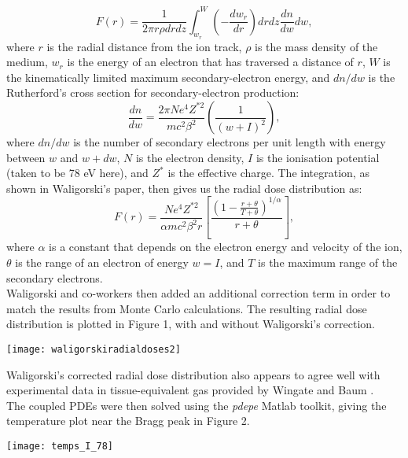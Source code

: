 \documentclass{article}
\begin{document}
\begin{multicols}{2}
\begin{equation}F(r)=\frac{1}{2\pi r\rho dr dz}\int_{w_{r}}^{W} (-\frac{dw_{r}}{dr}) dr dz \frac{dn}{dw} dw,
\end{equation}
where $r$ is the radial distance from the ion track, $\rho$ is the mass density of the medium, $w_{r}$ is the energy of an electron that has traversed a distance of $r$, $W$ is the kinematically limited maximum secondary-electron energy, and $dn/dw$ is the Rutherford's cross section for secondary-electron production:
\begin{equation} \frac{dn}{dw}=\frac{2\pi Ne^{4}Z^{*2}}{mc^{2}\beta^{2}}\left(\frac{1}{(w+I)^{2}}\right),
\end{equation}
where $dn/dw$ is the number of secondary electrons per unit length with energy between $w$ and $w+dw$, $N$ is the electron density, $I$ is the ionisation potential (taken to be 78 eV here), and $Z^{*}$ is the effective charge. The integration, as shown in Waligorski's paper, then gives us the radial dose distribution as:
\begin{equation} F(r)=\frac{Ne^{4}Z^{*2}}{\alpha mc^{2}\beta^{2}r}\left[\frac{(1-\frac{r+\theta}{T+\theta})^{1/\alpha}}{r+\theta}\right],
\end{equation}
where $\alpha$ is a constant that depends on the electron energy and velocity of the ion, $\theta$ is the range of an electron of energy $w=I$, and $T$ is the maximum range of the secondary electrons. \\
\indent Waligorski and co-workers then added an additional correction term \cite{waligorski} in order to match the results from Monte Carlo calculations. The resulting radial dose distribution is plotted in Figure 1, with and without Waligorski's correction. 
%
\begin{center}
\texttt{[image: waligorskiradialdoses2]}
\captionsetup[figure]{format=hang,font=small}
\label{fig1}
\end{center}
\indent Waligorski's corrected radial dose distribution also appears to agree well with experimental data in tissue-equivalent gas provided by Wingate and Baum \cite{wingate}.  \\
\indent The coupled PDEs were then solved using the \textit{pdepe} Matlab toolkit, giving the temperature plot near the Bragg peak in Figure 2. 
%
\begin{center}
\texttt{[image: temps\_I\_78]}
\captionsetup[figure]{format=hang,font=small}
\label{fig2}
\end{center}
 

\end{multicols}
\end{document}
